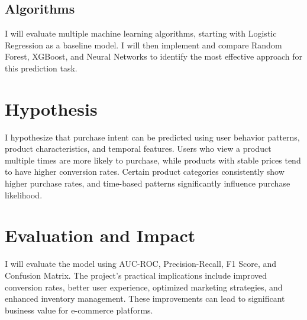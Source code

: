 \documentclass[12pt]{article}
\begin{document}
\subsection{Algorithms}
I will evaluate multiple machine learning algorithms, starting with Logistic Regression as a baseline model. I will then implement and compare Random Forest, XGBoost, and Neural Networks to identify the most effective approach for this prediction task.

\section{Hypothesis}
I hypothesize that purchase intent can be predicted using user behavior patterns, product characteristics, and temporal features. Users who view a product multiple times are more likely to purchase, while products with stable prices tend to have higher conversion rates. Certain product categories consistently show higher purchase rates, and time-based patterns significantly influence purchase likelihood.

\section{Evaluation and Impact}
I will evaluate the model using AUC-ROC, Precision-Recall, F1 Score, and Confusion Matrix. The project's practical implications include improved conversion rates, better user experience, optimized marketing strategies, and enhanced inventory management. These improvements can lead to significant business value for e-commerce platforms.

\end{document}
